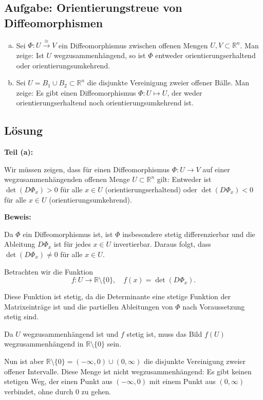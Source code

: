 \documentclass{article}
\newcommand{\R}{\mathbb{R}}
\begin{document}
\subsection*{Aufgabe: Orientierungstreue von Diffeomorphismen}

\begin{enumerate}[(a)]
    \item Sei $\Phi \colon U \stackrel{\cong} \longrightarrow V$ ein Diffeomorphismus zwischen offenen Mengen $U, V \subset \R^n$. Man zeige: Ist $U$ wegzusammenhängend, so ist $\Phi$ entweder orientierungserhaltend oder orientierungsumkehrend.
    \item Sei $U=B_1\cup B_2\subset\R^n$ die disjunkte Vereinigung zweier offener Bälle. Man zeige: Es gibt einen Diffeomorphismus $\Phi \colon U \mapsto U$, der weder orientierungserhaltend noch orientierungsumkehrend ist.
\end{enumerate}

\subsection*{Lösung}

\textbf{Teil (a):}

Wir müssen zeigen, dass für einen Diffeomorphismus $\Phi: U \to V$ auf einer wegzusammenhängenden offenen Menge $U \subset \R^n$ gilt: Entweder ist $\det(D\Phi_x) > 0$ für alle $x \in U$ (orientierungserhaltend) oder $\det(D\Phi_x) < 0$ für alle $x \in U$ (orientierungsumkehrend).

\textbf{Beweis:}

Da $\Phi$ ein Diffeomorphismus ist, ist $\Phi$ insbesondere stetig differenzierbar und die Ableitung $D\Phi_x$ ist für jedes $x \in U$ invertierbar. Daraus folgt, dass $\det(D\Phi_x) \neq 0$ für alle $x \in U$.

Betrachten wir die Funktion
\[
f: U \to \R \setminus \{0\}, \quad f(x) = \det(D\Phi_x).
\]

Diese Funktion ist stetig, da die Determinante eine stetige Funktion der Matrixeinträge ist und die partiellen Ableitungen von $\Phi$ nach Voraussetzung stetig sind.

Da $U$ wegzusammenhängend ist und $f$ stetig ist, muss das Bild $f(U)$ wegzusammenhängend in $\R \setminus \{0\}$ sein.

Nun ist aber $\R \setminus \{0\} = (-\infty, 0) \cup (0, \infty)$ die disjunkte Vereinigung zweier offener Intervalle. Diese Menge ist nicht wegzusammenhängend: Es gibt keinen stetigen Weg, der einen Punkt aus $(-\infty, 0)$ mit einem Punkt aus $(0, \infty)$ verbindet, ohne durch $0$ zu gehen.
\end{document}
